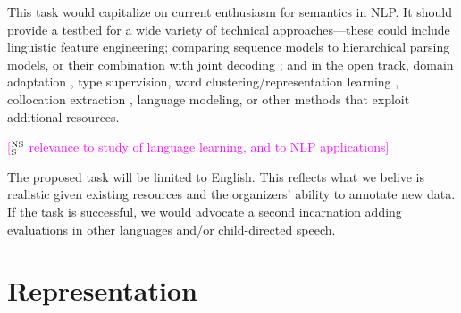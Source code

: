 \documentclass[11pt]{article}
\newcommand{\ensuretext}[1]{#1}
\newcommand{\nssmarker}{\ensuretext{\textcolor{magenta}{\ensuremath{^{\textsc{NS}}_{\textsc{S}}}}}}
\newcommand{\arkcomment}[3]{\ensuretext{\textcolor{#3}{[#1 #2]}}}
\newcommand{\nss}[1]{\arkcomment{\nssmarker}{#1}{magenta}}
\begin{document}
This task would capitalize on current enthusiasm for semantics in NLP.
It should provide a testbed for a wide variety of technical approaches---these could include 
linguistic feature engineering; comparing sequence models to hierarchical parsing models, or their combination 
with joint decoding \citep{le_roux-14}; and in the open track, domain adaptation \citep{johannsen-14}, 
type supervision, word clustering\slash representation learning \citep{grave-13}, 
collocation extraction \citep{pecina-10,ramisch-12}, 
language modeling, or other methods that exploit additional resources.

\nss{relevance to study of language learning, and to NLP applications}

The proposed task will be limited to English. 
This reflects what we belive is realistic given existing resources 
and the organizers' ability to annotate new data. 
If the task is successful, we would advocate a second incarnation 
adding evaluations in other languages and/or child-directed speech.

\section{Representation}
\end{document}
